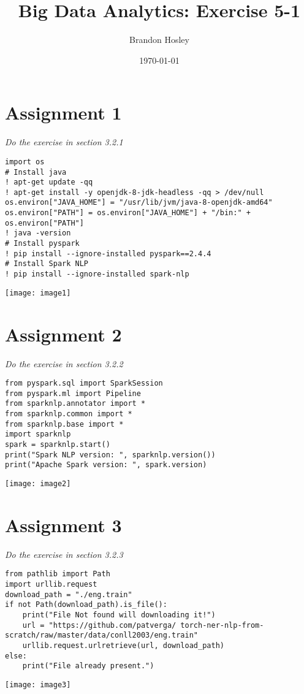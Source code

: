 \documentclass[]{article}
\title{Big Data Analytics: Exercise 5-1}
\author{Brandon Hosley}
\date{\today}
\begin{document}
\maketitle

\section*{Assignment 1}
\emph{ Do the exercise in section 3.2.1 }

\begin{verbatim}
import os
# Install java
! apt-get update -qq
! apt-get install -y openjdk-8-jdk-headless -qq > /dev/null
os.environ["JAVA_HOME"] = "/usr/lib/jvm/java-8-openjdk-amd64"
os.environ["PATH"] = os.environ["JAVA_HOME"] + "/bin:" + os.environ["PATH"]
! java -version
# Install pyspark
! pip install --ignore-installed pyspark==2.4.4
# Install Spark NLP
! pip install --ignore-installed spark-nlp
\end{verbatim}
\texttt{[image: image1]} %


\section*{Assignment 2}
\emph{ Do the exercise in section 3.2.2 }

\begin{verbatim}
from pyspark.sql import SparkSession
from pyspark.ml import Pipeline
from sparknlp.annotator import *
from sparknlp.common import *
from sparknlp.base import *
import sparknlp
spark = sparknlp.start()
print("Spark NLP version: ", sparknlp.version())
print("Apache Spark version: ", spark.version)
\end{verbatim}
\texttt{[image: image2]} %


\section*{Assignment 3}
\emph{ Do the exercise in section 3.2.3 }

\begin{verbatim}
from pathlib import Path
import urllib.request
download_path = "./eng.train"
if not Path(download_path).is_file():
	print("File Not found will downloading it!")
	url = "https://github.com/patverga/ torch-ner-nlp-from-scratch/raw/master/data/conll2003/eng.train"
	urllib.request.urlretrieve(url, download_path)
else:
	print("File already present.")
\end{verbatim}
\texttt{[image: image3]} %
\end{document}
